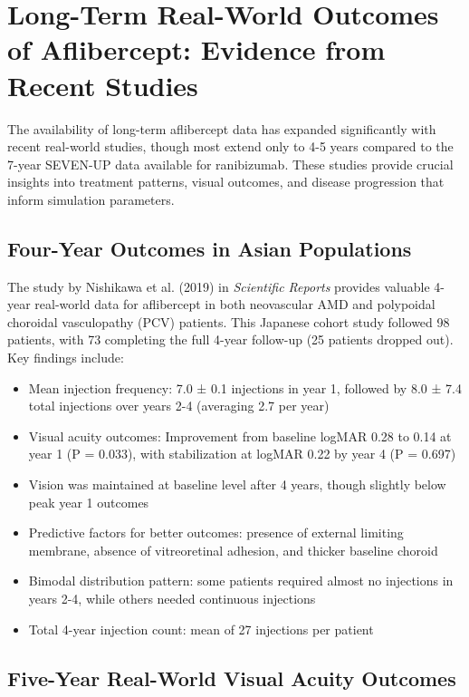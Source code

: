 
\section{Long-Term Real-World Outcomes of Aflibercept: Evidence from Recent Studies}

The availability of long-term aflibercept data has expanded significantly with recent real-world studies, though most extend only to 4-5 years compared to the 7-year SEVEN-UP data available for ranibizumab. These studies provide crucial insights into treatment patterns, visual outcomes, and disease progression that inform simulation parameters.

\subsection{Four-Year Outcomes in Asian Populations}

The study by Nishikawa et al. (2019) in \textit{Scientific Reports} provides valuable 4-year real-world data for aflibercept in both neovascular AMD and polypoidal choroidal vasculopathy (PCV) patients. This Japanese cohort study followed 98 patients, with 73 completing the full 4-year follow-up (25 patients dropped out). Key findings include:

\begin{itemize}
    \item Mean injection frequency: 7.0 ± 0.1 injections in year 1, followed by 8.0 ± 7.4 total injections over years 2-4 (averaging 2.7 per year)
    \item Visual acuity outcomes: Improvement from baseline logMAR 0.28 to 0.14 at year 1 (P = 0.033), with stabilization at logMAR 0.22 by year 4 (P = 0.697)
    \item Vision was maintained at baseline level after 4 years, though slightly below peak year 1 outcomes
    \item Predictive factors for better outcomes: presence of external limiting membrane, absence of vitreoretinal adhesion, and thicker baseline choroid
    \item Bimodal distribution pattern: some patients required almost no injections in years 2-4, while others needed continuous injections
    \item Total 4-year injection count: mean of 27 injections per patient
\end{itemize}

\subsection{Five-Year Real-World Visual Acuity Outcomes}


